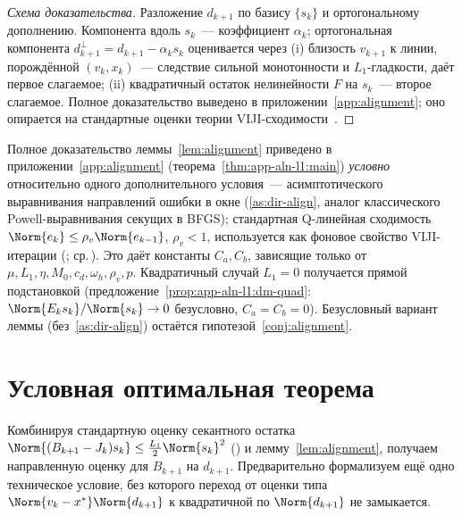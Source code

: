 \begin{proof}[Схема доказательства]
Разложение $d_{k+1}$ по базису $\{s_k\}$ и ортогональному дополнению.
Компонента вдоль $s_k$~--- коэффициент $\alpha_k$; ортогональная
компонента $d_{k+1}^{\perp} = d_{k+1} - \alpha_k s_k$ оценивается
через (i) близость $v_{k+1}$ к линии, порождённой $(v_k, x_k)$~---
следствие сильной монотонности и $L_1$-гладкости, даёт первое
слагаемое; (ii) квадратичный остаток нелинейности $F$ на $s_k$~---
второе слагаемое. Полное доказательство выведено в
приложении~\ref{app:alignment}; оно опирается на стандартные оценки
теории VIJI-сходимости~\cite[Lemma~4.1]{Agafonov2024VIJI}.
\end{proof}

\begin{remark}
\label{rem:align-status}
Полное доказательство леммы~\ref{lem:alignment} приведено в
приложении~\ref{app:alignment} (теорема~\ref{thm:app-aln-l1:main})
\emph{условно} относительно одного дополнительного условия~---
асимптотического выравнивания направлений ошибки в окне
\textup{(}\ref{as:dir-align}, аналог классического Powell-выравнивания
секущих в BFGS\textup{)}; стандартная Q-линейная сходимость
$\Norm{e_k}\le\rho_v\Norm{e_{k-1}}$, $\rho_v<1$, используется как
фоновое свойство VIJI-итерации \textup{(}\cite[Theorem~3.4]{Agafonov2024VIJI};
ср.\,\cite[Definition~9.1.5]{dennis1996}\textup{)}. Это даёт константы
$C_a, C_b$, зависящие только от $\mu, L_1, \eta, M_0, c_d, \omega_h, \rho_v, p$.
Квадратичный случай $L_1=0$ получается прямой подстановкой
\textup{(}предложение~\ref{prop:app-aln-l1:dm-quad}: $\Norm{E_k s_k}/\Norm{s_k}\to 0$
безусловно, $C_a=C_b=0$\textup{)}. Безусловный вариант леммы
(без~\ref{as:dir-align}) остаётся гипотезой~\ref{conj:alignment}.
\end{remark}

\section{Условная оптимальная теорема}
\label{sec:viji:theorem}

Комбинируя стандартную оценку секантного остатка
$\Norm{(B_{k+1} - J_k) s_k} \le \tfrac{L_1}{2}\Norm{s_k}^2$
(\cite[Lemma~4.1.12]{dennis1996}) и лемму~\ref{lem:alignment}, получаем
направленную оценку для $B_{k+1}$ на $d_{k+1}$. Предварительно
формализуем ещё одно техническое условие, без которого переход от
оценки типа $\Norm{v_k - x^{*}}\Norm{d_{k+1}}$ к квадратичной по
$\Norm{d_{k+1}}$ не замыкается.

